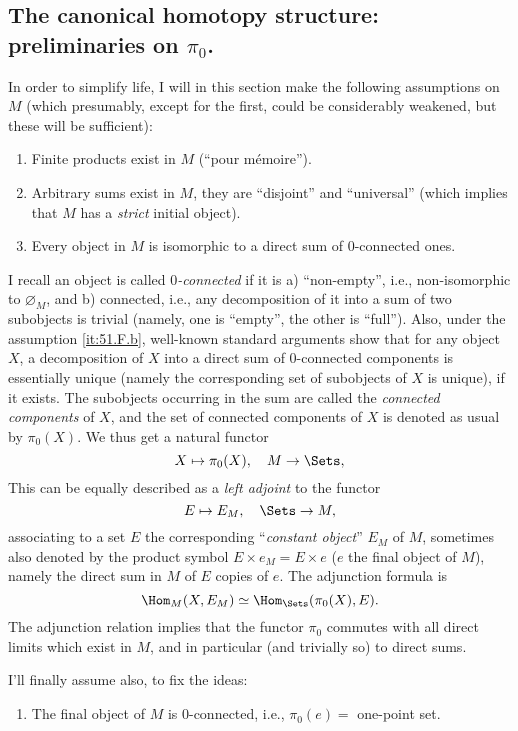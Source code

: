 \subsection{The canonical homotopy structure: preliminaries on
  \texorpdfstring{$\pi_0$}{pi0}.}\label{subsec:51.F}
In order to simplify life, I will in this section make the following
assumptions on $M$ (which presumably, except for the first, could
be considerably weakened, but these will be sufficient):
\begin{enumerate}[label=\alph*)]
\item\label{it:51.F.a}
  Finite products exist in $M$ (``pour m\'emoire'').
\item\label{it:51.F.b}
  Arbitrary sums exist in $M$, they are ``disjoint'' and ``universal''
  (which implies that $M$ has a \emph{strict} initial object).
\item\label{it:51.F.c}
  Every object in $M$ is isomorphic to a direct sum of $0$-connected ones.
\end{enumerate}

I recall an object is called \emph{$0$-connected} if it is a)
``non-empty'', i.e., non-isomorphic to $\varnothing_M$, and b)
connected, i.e., any decomposition of it into a sum of two subobjects
is trivial (namely, one is ``empty'', the other is ``full''). Also,
under the assumption \ref{it:51.F.b}, well-known standard arguments
show that for any object $X$, a decomposition of $X$ into a direct sum
of $0$-connected components is essentially unique (namely the
corresponding set of subobjects of $X$ is unique), if it exists. The
subobjects occurring in the sum are called the \emph{connected
  components} of $X$, and the set of connected components of $X$ is
denoted as usual by $\pi_0(X)$. We thus get a natural functor
\[ X \mapsto \pi_0(X), \quad M \to \Sets,\]
This can be equally described as a \emph{left adjoint} to the functor
\[ E \mapsto E_M, \quad \Sets \to M,\]
associating to a set $E$ the corresponding ``\emph{constant object}''
$E_M$ of $M$, sometimes also denoted by the product symbol $E\times
e_M = E\times e$ ($e$ the final object of $M$), namely the direct sum
in $M$ of $E$ copies of $e$. The adjunction formula is
\[\Hom_M(X,E_M) \simeq \Hom_\Sets(\pi_0(X),E).\]
The adjunction relation implies that the functor $\pi_0$ commutes with
all direct limits which exist in $M$, and in particular (and trivially
so) to direct sums.

I'll finally assume also, to fix the ideas:
\begin{enumerate}[label=\alph*),resume]
\item\label{it:51.F.d}
  The final object of $M$ is $0$-connected, i.e., $\pi_0(e)=$
  one-point set.
\end{enumerate}

